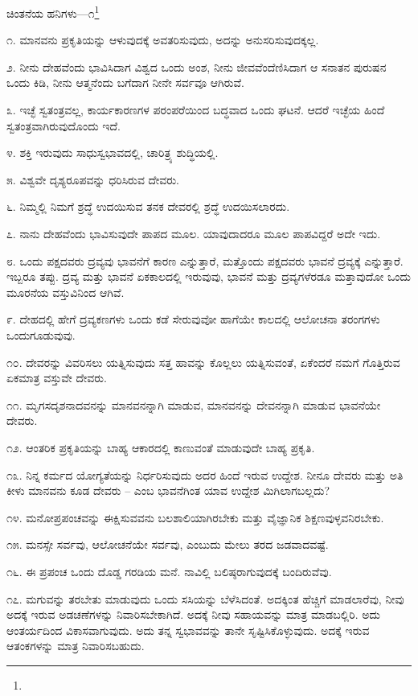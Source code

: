 ಚಿಂತನೆಯ ಹನಿಗಳು—೧\protect\footnote{}

೧. ಮಾನವನು ಪ್ರಕೃತಿಯನ್ನು ಆಳುವುದಕ್ಕೆ ಅವತರಿಸುವುದು, ಅದನ್ನು ಅನುಸರಿಸುವುದಕ್ಕಲ್ಲ.

೨. ನೀನು ದೇಹವೆಂದು ಭಾವಿಸಿದಾಗ ವಿಶ್ವದ ಒಂದು ಅಂಶ, ನೀನು ಜೀವವೆಂದೆಣಿಸಿದಾಗ ಆ ಸನಾತನ ಪುರುಷನ ಒಂದು ಕಿಡಿ, ನೀನು ಆತ್ಮನೆಂದು ಬಗೆದಾಗ ನೀನೇ ಸರ್ವವೂ ಆಗಿರುವೆ.

೩. ಇಚ್ಛೆ ಸ್ವತಂತ್ರವಲ್ಲ, ಕಾರ್ಯಕಾರಣಗಳ ಪರಂಪರೆಯಿಂದ ಬದ್ಧವಾದ ಒಂದು ಘಟನೆ. ಆದರೆ ಇಚ್ಛೆಯ ಹಿಂದೆ ಸ್ವತಂತ್ರವಾಗಿರುವುದೊಂದು ಇದೆ.

೪. ಶಕ್ತಿ ಇರುವುದು ಸಾಧುಸ್ವಭಾವದಲ್ಲಿ, ಚಾರಿತ್ರ್ಯ ಶುದ್ಧಿಯಲ್ಲಿ.

೫. ವಿಶ್ವವೇ ದೃಶ್ಯರೂಪವನ್ನು ಧರಿಸಿರುವ ದೇವರು.

೬. ನಿಮ್ಮಲ್ಲಿ ನಿಮಗೆ ಶ್ರದ್ಧೆ ಉದಯಿಸುವ ತನಕ ದೇವರಲ್ಲಿ ಶ್ರದ್ಧೆ ಉದಯಿಸಲಾರದು.

೭. ನಾನು ದೇಹವೆಂದು ಭಾವಿಸುವುದೇ ಪಾಪದ ಮೂಲ. ಯಾವುದಾದರೂ ಮೂಲ ಪಾಪವಿದ್ದರೆ ಅದೇ ಇದು.

೮. ಒಂದು ಪಕ್ಷದವರು ದ್ರವ್ಯವು  ಭಾವನೆಗೆ  ಕಾರಣ ಎನ್ನುತ್ತಾರೆ, ಮತ್ತೊಂದು ಪಕ್ಷದವರು ಭಾವನೆ ದ್ರವ್ಯಕ್ಕೆ ಎನ್ನುತ್ತಾರೆ. ಇಬ್ಬರೂ ತಪ್ಪು. ದ್ರವ್ಯ ಮತ್ತು ಭಾವನೆ ಏಕಕಾಲದಲ್ಲಿ ಇರುವುವು, ಭಾವನೆ ಮತ್ತು ದ್ರವ್ಯಗಳೆರಡೂ ಮತ್ತಾವುದೋ ಒಂದು ಮೂರನೆಯ ವಸ್ತುವಿನಿಂದ ಆಗಿವೆ.

೯. ದೇಹದಲ್ಲಿ ಹೇಗೆ ದ್ರವ್ಯಕಣಗಳು ಒಂದು ಕಡೆ ಸೇರುವುವೋ ಹಾಗೆಯೇ ಕಾಲದಲ್ಲಿ ಆಲೋಚನಾ ತರಂಗಗಳು ಒಂದುಗೂಡುವುವು.

೧೦. ದೇವರನ್ನು ವಿವರಿಸಲು ಯತ್ನಿಸುವುದು ಸತ್ತ ಹಾವನ್ನು ಕೊಲ್ಲಲು ಯತ್ನಿಸುವಂತೆ, ಏಕೆಂದರೆ ನಮಗೆ ಗೊತ್ತಿರುವ ಏಕಮಾತ್ರ ವಸ್ತುವೇ ದೇವರು.

೧೧. ಮೃಗಸದೃಶನಾದವನನ್ನು ಮಾನವನನ್ನಾಗಿ ಮಾಡುವ, ಮಾನವನನ್ನು ದೇವನನ್ನಾಗಿ ಮಾಡುವ ಭಾವನೆಯೇ ದೇವರು.

೧೨. ಆಂತರಿಕ ಪ್ರಕೃತಿಯನ್ನು ಬಾಹ್ಯ ಆಕಾರದಲ್ಲಿ ಕಾಣುವಂತೆ ಮಾಡುವುದೇ ಬಾಹ್ಯ ಪ್ರಕೃತಿ.

೧೩. ನಿನ್ನ ಕರ್ಮದ ಯೋಗ್ಯತೆಯನ್ನು ನಿರ್ಧರಿಸುವುದು ಅದರ ಹಿಂದೆ ಇರುವ ಉದ್ದೇಶ. ನೀನೂ ದೇವರು ಮತ್ತು ಅತಿ ಕೀಳು ಮಾನವನು ಕೂಡ ದೇವರು – ಎಂಬ ಭಾವನೆಗಿಂತ ಯಾವ ಉದ್ದೇಶ ಮಿಗಿಲಾಗಬಲ್ಲದು?

೧೪. ಮನೋಪ್ರಪಂಚವನ್ನು ಈಕ್ಷಿಸುವವನು ಬಲಶಾಲಿಯಾಗಿರಬೇಕು ಮತ್ತು ವೈಜ್ಞಾನಿಕ ಶಿಕ್ಷಣವುಳ್ಳವನಿರಬೇಕು.

೧೫. ಮನಸ್ಸೇ ಸರ್ವವು, ಆಲೋಚನೆಯೇ ಸರ್ವವು, ಎಂಬುದು ಮೇಲು ತರದ ಜಡವಾದವಷ್ಟೆ.

೧೬. ಈ ಪ್ರಪಂಚ ಒಂದು ದೊಡ್ಡ ಗರಡಿಯ ಮನೆ. ನಾವಿಲ್ಲಿ ಬಲಿಷ್ಠರಾಗುವುದಕ್ಕೆ ಬಂದಿರುವೆವು.

೧೭. ಮಗುವನ್ನು ತರಬೇತು ಮಾಡುವುದು ಒಂದು ಸಸಿಯನ್ನು ಬೆಳೆಸಿದಂತೆ. ಅದಕ್ಕಿಂತ ಹೆಚ್ಚಿಗೆ ಮಾಡಲಾರೆವು, ನೀವು ಅದಕ್ಕೆ ಇರುವ ಅಡಚಣೆಗಳನ್ನು ನಿವಾರಿಸಬೇಕಾಗಿದೆ. ಅದಕ್ಕೆ ನೀವು ಸಹಾಯವನ್ನು ಮಾತ್ರ ಮಾಡಬಲ್ಲಿರಿ. ಅದು ಆಂತರ್ಯದಿಂದ ವಿಕಾಸವಾಗುವುದು. ಅದು ತನ್ನ ಸ್ವಭಾವವನ್ನು ತಾನೇ ಸೃಷ್ಟಿಸಿಕೊಳ್ಳುವುದು. ಅದಕ್ಕೆ ಇರುವ ಆತಂಕಗಳನ್ನು ಮಾತ್ರ ನಿವಾರಿಸಬಹುದು.

